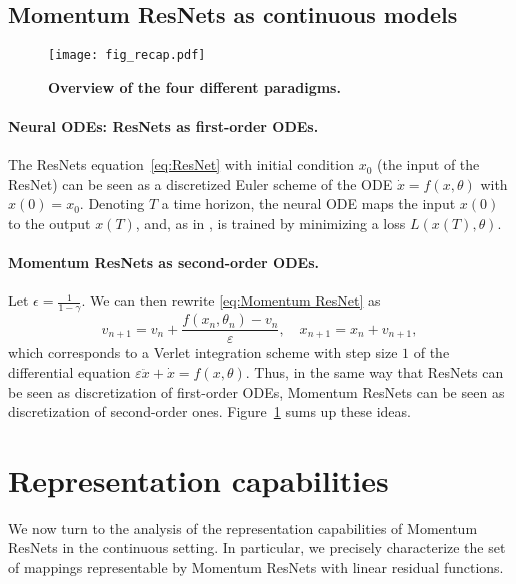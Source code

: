 \documentclass{article}
\begin{document}
\subsection{Momentum ResNets as continuous models}

\begin{figure}[H]
\texttt{[image: fig\_recap.pdf]} 
\caption{\textbf{Overview of the four different paradigms.} }\label{fig:recap}
\vspace{-1em}
\end{figure}

\paragraph{Neural ODEs: ResNets as first-order ODEs.}
The ResNets equation~\eqref{eq:ResNet} with initial condition $x_0$ (the input of the ResNet) can be seen as a discretized Euler scheme of the ODE $\dot{x}=f(x,\theta)$ with $x(0) = x_0$.
Denoting $T$ a time horizon, the neural ODE maps the input $x(0)$ to the output $x(T)$, and, as in \citet{chen2018neural}, is trained by minimizing a loss $L(x(T),\theta)$. 

\paragraph{Momentum ResNets as second-order ODEs.}

Let $\epsilon = \frac{1}{1-\gamma}$. We can then rewrite \eqref{eq:Momentum ResNet} as 
\begin{equation*}\label{eq:mom_eq}
v_{n+1} = v_{n} +  \frac{f(x_{n},\theta_n)-v_n}{\varepsilon}, 
\quad
x_{n+1} = x_{n} +   v_{n+1},
\end{equation*}
which corresponds to a Verlet integration scheme \citep{Hairer:1250576} with step size $1$ of the differential equation $\varepsilon \ddot{x} + \dot{x} = f(x,\theta). $
Thus, in the same way that ResNets can be seen as discretization of first-order ODEs, Momentum ResNets can be seen as discretization of second-order ones. 
Figure~\ref{fig:recap} sums up these ideas.
\section{Representation capabilities}\label{section:representation_capabilities}
We now turn to the analysis of the representation capabilities of Momentum ResNets in the continuous setting. In particular, we precisely characterize the set of mappings representable by Momentum ResNets with linear residual functions. 
\end{document}
